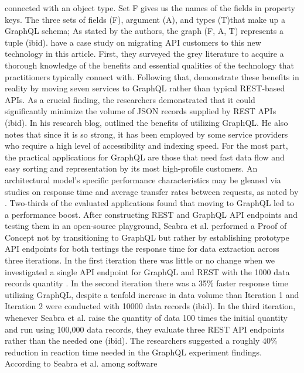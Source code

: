 connected with an object type. Set F gives us the names of the fields in
property keys. The three sets of fields (F), argument (A), and types (T)that
make up a GraphQL schema; As stated by the authors, the graph (F, A, T)
represents a tuple (ibid). \citet{britoMigratingGraphQLPractical2019} have a
case study on migrating API customers to this new technology in this article.
First, they surveyed the grey literature to acquire a thorough knowledge of the
benefits and essential qualities of the technology that practitioners typically
connect with. Following that, \citet{britoMigratingGraphQLPractical2019}
demonstrate these benefits in reality by moving seven services to GraphQL rather
than typical REST-based APIs. As a crucial finding, the researchers demonstrated
that it could significantly minimize the volume of JSON records supplied by REST
APIs (ibid). In his research blog, \citet{kristopherUniqueBenefitsUsing2018}
outlined the benefits of utilizing GraphQL. He also notes that since it is so
strong, it has been employed by some service providers who require a high level
of accessibility and indexing speed. For the most part, the practical
applications for GraphQL are those that need fast data flow and easy sorting and
representation by its most high-profile customers. An architectural model's
specific performance characteristics may be gleaned via studies on response time
and average transfer rates between requests, as noted by
\citet{seabraRESTGraphQLPerformance2019}. Two-thirds of the evaluated
applications found that moving to GraphQL led to a performance boost. After
constructing REST and GraphQL API endpoints and testing them in an open-source
playground, Seabra et al. performed a Proof of Concept not by transitioning to
GraphQL but rather by establishing prototype API endpoints for both testings the
response time for data extraction across three iterations. In the first
iteration there was little or no change when we investigated a single API
endpoint for GraphQL and REST with the 1000 data records quantity
\citep{seabraRESTGraphQLPerformance2019}. In the second iteration there was a
35\% faster response time utilizing GraphQL, despite a tenfold increase in data
volume than Iteration 1 and Iteration 2 were conducted with 10000 data records
(ibid). In the third iteration, whenever Seabra et al. raise the quantity of
data 100 times the initial quantity and run using 100,000 data records, they
evaluate three REST API endpoints rather than the needed one (ibid). The
researchers suggested a roughly 40\% reduction in reaction time needed in
the GraphQL experiment findings. According to Seabra et al. among software

